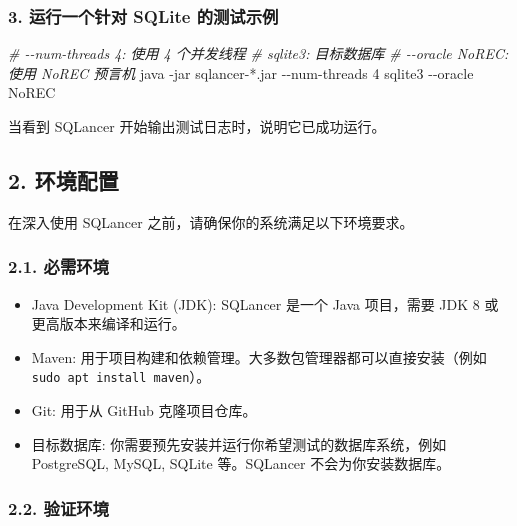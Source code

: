 \documentclass[
]{article}
\newenvironment{Shaded}{}{}
\newcommand{\AttributeTok}[1]{\textcolor[rgb]{0.49,0.56,0.16}{#1}}
\newcommand{\CommentTok}[1]{\textcolor[rgb]{0.38,0.63,0.69}{\textit{#1}}}
\newcommand{\ExtensionTok}[1]{#1}
\newcommand{\NormalTok}[1]{#1}
\newcommand{\PreprocessorTok}[1]{\textcolor[rgb]{0.74,0.48,0.00}{#1}}
\providecommand{\tightlist}{%
  \setlength{\itemsep}{0pt}\setlength{\parskip}{0pt}}
\begin{document}
\subsubsection{3. 运行一个针对 SQLite
的测试示例}\label{ux8fd0ux884cux4e00ux4e2aux9488ux5bf9-sqlite-ux7684ux6d4bux8bd5ux793aux4f8b}

\begin{Shaded}
\begin{Highlighting}[]
\CommentTok{\# {-}{-}num{-}threads 4: 使用 4 个并发线程}
\CommentTok{\# sqlite3:       目标数据库}
\CommentTok{\# {-}{-}oracle NoREC:  使用 NoREC 预言机}
\ExtensionTok{java} \AttributeTok{{-}jar}\NormalTok{ sqlancer{-}}\PreprocessorTok{*}\NormalTok{.jar }\AttributeTok{{-}{-}num{-}threads}\NormalTok{ 4 sqlite3 }\AttributeTok{{-}{-}oracle}\NormalTok{ NoREC}
\end{Highlighting}
\end{Shaded}

当看到 SQLancer 开始输出测试日志时，说明它已成功运行。

\subsection{2. 环境配置}\label{ux73afux5883ux914dux7f6e}

在深入使用 SQLancer 之前，请确保你的系统满足以下环境要求。

\subsubsection{2.1. 必需环境}\label{ux5fc5ux9700ux73afux5883}

\begin{itemize}
\tightlist
\item
  Java Development Kit (JDK): SQLancer 是一个 Java 项目，需要 JDK 8
  或更高版本来编译和运行。
\item
  Maven: 用于项目构建和依赖管理。大多数包管理器都可以直接安装（例如
  \texttt{sudo\ apt\ install\ maven}）。
\item
  Git: 用于从 GitHub 克隆项目仓库。
\item
  目标数据库: 你需要预先安装并运行你希望测试的数据库系统，例如
  PostgreSQL, MySQL, SQLite 等。SQLancer 不会为你安装数据库。
\end{itemize}

\subsubsection{2.2. 验证环境}\label{ux9a8cux8bc1ux73afux5883}
\end{document}

